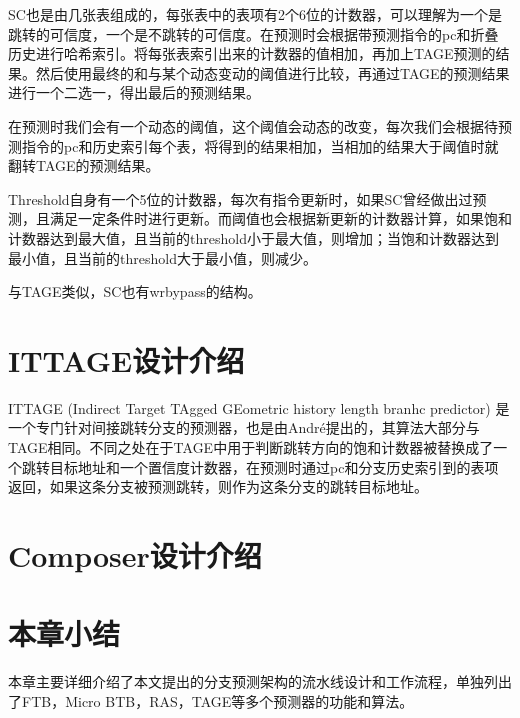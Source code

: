 SC也是由几张表组成的，每张表中的表项有2个6位的计数器，可以理解为一个是跳转的可信度，一个是不跳转的可信度。在预测时会根据带预测指令的pc和折叠历史进行哈希索引。将每张表索引出来的计数器的值相加，再加上TAGE预测的结果。然后使用最终的和与某个动态变动的阈值进行比较，再通过TAGE的预测结果进行一个二选一，得出最后的预测结果。

在预测时我们会有一个动态的阈值，这个阈值会动态的改变，每次我们会根据待预测指令的pc和历史索引每个表，将得到的结果相加，当相加的结果大于阈值时就翻转TAGE的预测结果。

Threshold自身有一个5位的计数器，每次有指令更新时，如果SC曾经做出过预测，且满足一定条件时进行更新。而阈值也会根据新更新的计数器计算，如果饱和计数器达到最大值，且当前的threshold小于最大值，则增加；当饱和计数器达到最小值，且当前的threshold大于最小值，则减少。


与TAGE类似，SC也有wrbypass的结构。


\section{ITTAGE设计介绍}

ITTAGE (Indirect Target TAgged GEometric history length branhc predictor) 是一个专门针对间接跳转分支的预测器，也是由André提出的，其算法大部分与TAGE相同。不同之处在于TAGE中用于判断跳转方向的饱和计数器被替换成了一个跳转目标地址和一个置信度计数器，在预测时通过pc和分支历史索引到的表项返回，如果这条分支被预测跳转，则作为这条分支的跳转目标地址。

\section{Composer设计介绍}

\section{本章小结}

本章主要详细介绍了本文提出的分支预测架构的流水线设计和工作流程，单独列出了FTB，Micro BTB，RAS，TAGE等多个预测器的功能和算法。